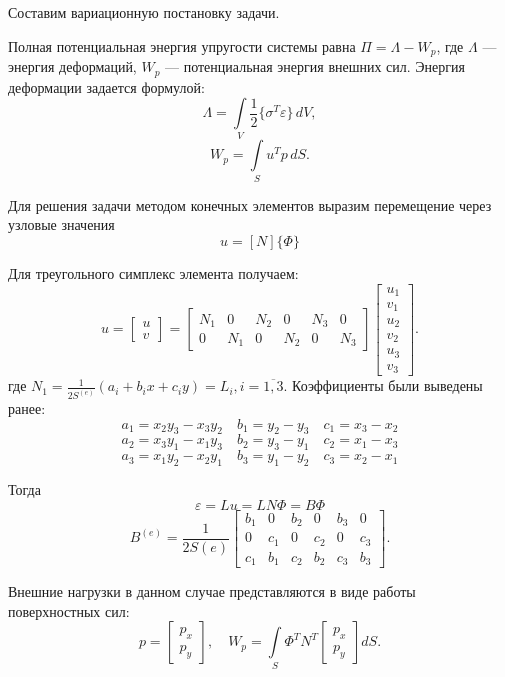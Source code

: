\documentclass[a4paper, 12pt]{article}
\begin{document}
Составим вариационную постановку задачи.

Полная потенциальная энергия упругости системы равна \(\Pi = \Lambda - W_p\), где \(\Lambda\) — энергия деформаций, \(W_p\) — потенциальная энергия внешних сил.  
Энергия деформации задается формулой:
\[
\Lambda = \int\limits_V \frac{1}{2} \{\sigma^T \varepsilon\} \, dV,
\]
\[
W_p = \int\limits_S u^T p \, dS.
\]

Для решения задачи методом конечных элементов выразим перемещение через узловые значения \[
u = \left[N\right] \{\Phi\}
\]


Для треугольного симплекс элемента получаем:
\[
u = \begin{bmatrix} u \\ v \end{bmatrix} =
\begin{bmatrix}
	N_1 & 0 & N_2 & 0 & N_3 & 0 \\
	0 & N_1 & 0 & N_2 & 0 & N_3
\end{bmatrix}
\begin{bmatrix}
	u_1 \\ v_1 \\ u_2 \\ v_2 \\ u_3 \\ v_3
\end{bmatrix}.
\]
где \(N_1 = \frac{1}{2S^{(e)}}(a_i + b_i x + c_i y) = L_i, i = \overline{1,3}.\) Коэффициенты были выведены ранее:  
\[
a_1 = x_2 y_3 - x_3 y_2 \quad b_1 = y_2 - y_3 \quad c_1 = x_3 - x_2
\]
\[
a_2 = x_3 y_1 - x_1 y_3 \quad b_2 = y_3 - y_1 \quad c_2 = x_1 - x_3
\]
\[
a_3 = x_1 y_2 - x_2 y_1 \quad b_3 = y_1 - y_2 \quad c_3 = x_2 - x_1
\]

Тогда 
\[
\varepsilon = L u = LN \Phi = B \Phi
\]
\[
B^{(e)} = \frac{1}{2S(e)}
\begin{bmatrix}
	b_1 & 0 & b_2 & 0 & b_3 & 0 \\
	0 & c_1 & 0 & c_2 & 0 & c_3 \\
	c_1 & b_1 & c_2 & b_2 & c_3 & b_3
\end{bmatrix}.
\]

Внешние нагрузки в данном случае представляются в виде работы поверхностных сил:
\[
p = \begin{bmatrix} p_x \\ p_y \end{bmatrix}, \quad W_p =\int\limits_S \Phi^T N^T \begin{bmatrix} p_x \\ p_y \end{bmatrix} dS.
\]
\end{document}
